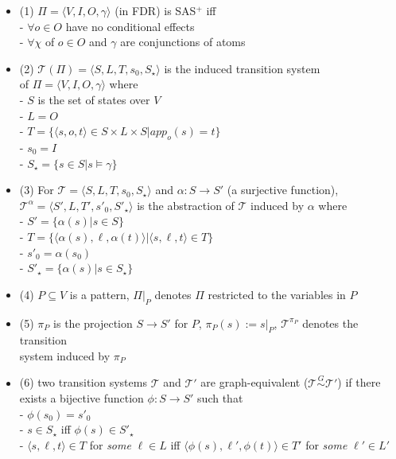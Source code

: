 \documentclass[11pt,a4paper]{article}
\begin{document}
\begin{itemize}
\item (1) $\Pi=\langle V,I,O,\gamma\rangle$ (in FDR) is SAS$^+$ iff\\
\hphantom{tabtab}- $\forall o\in O$ have no conditional effects\\
\hphantom{tabtab}- $\forall \chi$ of $o\in O$ and $\gamma$ are conjunctions of atoms
\item (2) $\mathscr{T}(\Pi)=\langle S,L,T,s_0,S_\star\rangle$ is the induced transition system\\
of $\Pi=\langle V,I,O,\gamma\rangle$ where\\
\hphantom{tabtab}- $S$ is the set of states over $V$\\
\hphantom{tabtab}- $L=O$\\
\hphantom{tabtab}- $T=\{\langle s,o,t\rangle\in S\times L\times S|app_o(s)=t\}$\\
\hphantom{tabtab}- $s_0=I$\\
\hphantom{tabtab}- $S_\star=\{s\in S|s\models\gamma\}$
\item (3) For $\mathscr{T}=\langle S,L,T,s_0,S_\star\rangle$ and $\alpha:S\to S'$ (a surjective function),\\
$\mathscr{T}^\alpha=\langle S',L,T',s'_0,S'_\star\rangle$ is the abstraction of $\mathscr{T}$ induced by $\alpha$ where\\
\hphantom{tabtab}- $S'=\{\alpha(s)|s\in S\}$\\
\hphantom{tabtab}- $T=\{\langle \alpha(s),\ell,\alpha(t)\rangle|\langle s,\ell,t\rangle\in T\}$\\
\hphantom{tabtab}- $s'_0=\alpha(s_0)$\\
\hphantom{tabtab}- $S'_\star=\{\alpha(s)|s\in S_\star\}$
\item (4) $P\subseteq V$ is a pattern, $\Pi|_P$ denotes $\Pi$ restricted to the variables in $P$
\item (5) $\pi_P$ is the projection $S\to S'$ for $P$, $\pi_P(s):=s|_P$, $\mathscr{T}^{\pi_P}$ denotes the transition\\
system induced by $\pi_P$
\item (6) two transition systems $\mathscr{T}$ and $\mathscr{T}'$ are graph-equivalent ($\mathscr{T}\stackrel{G}{\sim}\mathscr{T}'$) if there exists a bijective function $\phi:S\to S'$ such that\\
\hphantom{tabtab}- $\phi(s_0)=s'_0$\\
\hphantom{tabtab}- $s\in S_\star$ iff $\phi(s)\in S'_\star$\\
\hphantom{tabtab}- $\langle s,\ell,t\rangle\in T$ for \emph{some} $\ell\in L$ iff $\langle\phi(s),\ell',\phi(t)\rangle\in T'$ for \emph{some} $\ell'\in L'$\\
\end{itemize}
\end{document}
